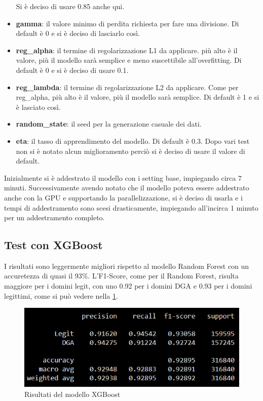 \documentclass[12pt,a4paper,openright,twoside]{book}
\begin{document}
\begin{itemize}
    Si è deciso di usare 0.85 anche qui.
    \item \textbf{gamma}: il valore minimo di perdita richiesta per fare una divisione.
    Di default è 0 e si è deciso di lasciarlo così.
    \item \textbf{reg\_alpha}: il termine di regolarizzazione L1 da applicare.
    più alto è il valore, più il modello sarà semplice e meno suscettibile all'overfitting.
    Di default è 0 e si è deciso di usare 0.1.
    \item \textbf{reg\_lambda}: il termine di regolarizzazione L2 da applicare.
    Come per reg\_alpha, più alto è il valore, più il modello sarà semplice.
    Di default è 1 e si è lasciato così.
    \item \textbf{random\_state}: il seed per la generazione casuale dei dati.
    \item \textbf{eta}: il tasso di apprendimento del modello.
    Di default è 0.3. Dopo vari test
    non si è notato alcun miglioramento perciò 
    si è deciso di usare il valore di default.
\end{itemize}

\noindent Inizialmente si è addestrato il modello con i setting base, impiegando circa 7 minuti. 
Successivamente avendo notato che il modello
poteva essere addestrato anche con la GPU e supportando la parallelizzazione, si è deciso di usarla
e i tempi di addestramento sono scesi drasticamente,
impiegando all'incirca 1 minuto per un addestramento completo.

\subsection{Test con XGBoost}
I risultati sono leggermente migliori rispetto al modello Random Forest
con un accuretezza di quasi il 93\%. L'F1-Score, come per il Random Forest,
risulta maggiore per i domini legit,
con uno 0.92 per i domini DGA e 0.93 per i domini legittimi,
come si può vedere nella \cref{fig:XGBoost results}.
\begin{figure}[H]
    \centering
    \includegraphics[width=.8\linewidth]{figures/XGBoost_results.png}
    \caption{Risultati del modello XGBoost}
    \label{fig:XGBoost results}
\end{figure}
\end{document}

